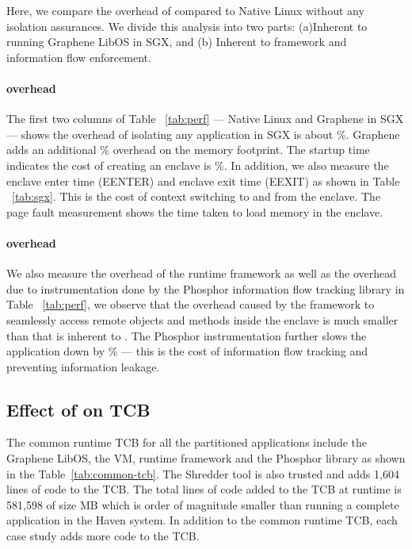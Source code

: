 Here, we compare the overhead of \systemname{} compared to Native Linux without any 
isolation assurances. We divide this analysis into two parts: (a)Inherent to running Graphene LibOS in SGX, and (b) Inherent to \systemname{} framework and information flow enforcement.

\paragraph{\sgx{} overhead}
The first two columns of Table ~\ref{tab:perf} --- Native Linux and Graphene in SGX --- shows the overhead of isolating any application in SGX is about \%. Graphene adds an additional \% overhead on the memory footprint. The startup time indicates the cost of creating an enclave is \%. 
In addition, we also measure the \sgx{} enclave enter time (EENTER) and enclave exit time (EEXIT) as shown in Table ~\ref{tab:sgx}. This is the cost of context switching to and from the enclave. The page fault measurement shows the time taken to load memory in the enclave.

\paragraph{\systemname{} overhead}
We also measure the overhead of the \systemname{} runtime framework as well as the 
overhead due to instrumentation done by the Phosphor information flow tracking library in Table ~\ref{tab:perf}, we observe that the overhead caused by the \systemname{} framework to seamlessly access remote objects and methods inside the enclave is much smaller than that is inherent to \sgx{}. The Phosphor instrumentation further slows the application down by \% --- this is the cost of information flow tracking and preventing information leakage. 
\subsection{Effect of \systemname{} on TCB}

The common runtime TCB for all the partitioned applications include the Graphene LibOS, 
the \java{} VM, \systemname{} runtime framework and the Phosphor library as shown in the 
Table~\ref{tab:common-tcb}. The \systemname{} Shredder tool is also trusted and 
adds 1,604 lines of code to the TCB. The total lines of code added to the TCB at runtime is 581,598 of size MB which is order of magnitude smaller than running a complete \java{} application in the Haven system.
In addition to the common runtime TCB, each case study adds more code to the TCB.

